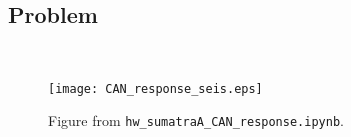 \documentclass[11pt,titlepage,fleqn]{article}
\newcommand{\tfileresponse}{{\tt hw\_sumatraA\_CAN\_response.ipynb}}
\begin{document}

\subsection*{Problem} \howmuchtime\




%

\begin{figure}
\hspace{-1cm}
\texttt{[image: CAN\_response\_seis.eps]}
\caption[]
{{
Figure from \tfileresponse.
}}
\label{fig:seis}
\end{figure}

\end{document}
